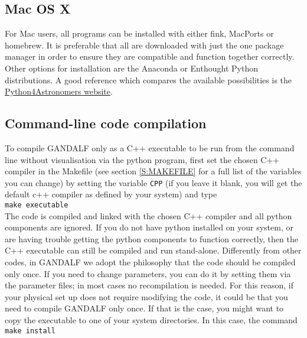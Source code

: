 \documentclass[a4paper]{article}
\newcommand{\var}[1]{\texttt{#1}}
\begin{document}
\subsection{Mac OS X}
For Mac users, all programs can be installed with either fink, MacPorts or homebrew.  It is preferable that all are downloaded with just the one package manager in order to ensure they are compatible and function together correctly. Other options for installation are the Anaconda or Enthought Python distributions. A good reference which compares the available possibilities is the \href{http://python4astronomers.github.io/installation/recommended_options.html}{Python4Astronomers website}.



\subsection{Command-line code compilation}

To compile GANDALF only as a C++ executable to be run from the command line without visualisation via the python program, first set the chosen C++ compiler in the Makefile (see section \ref{S:MAKEFILE} for a full list of the variables you can change) by setting the variable \var{CPP} (if you leave it blank, you will get the default c++ compiler as defined by your system) and type \\
\newline
\noindent \var{make executable} \\

\noindent The code is compiled and linked with the chosen C++ compiler and all python components are ignored.  If you do not have python installed on your system, or are having trouble getting the python components to function correctly, then the C++ executable can still be compiled and run stand-alone. Differently from other codes, in GANDALF we adopt the philosophy that the code should be compiled only once. If you need to change parameters, you can do it by setting them via the parameter files; in most cases no recompilation is needed. For this reason, if your physical set up does not require modifying the code, it could be that you need to compile GANDALF only once. If that is the case, you might want to copy the executable to one of your system directories. In this case, the command\\
\newline
\noindent \var{make install} \\
\end{document}
